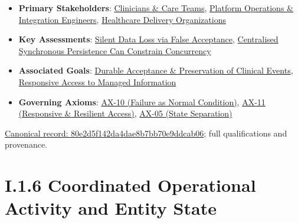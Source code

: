 \begin{itemize}


\item \textbf{Primary Stakeholders}: \href{\detokenize{../../../../../../../../docs/markdown/01-motivation/stakeholders/enterprise-stakeholders.md}}{Clinicians \& Care Teams}, \href{\detokenize{../../../../../../../../docs/markdown/01-motivation/stakeholders/enterprise-stakeholders.md}}{Platform Operations \& Integration Engineers}, \href{\detokenize{../../../../../../../../docs/markdown/01-motivation/stakeholders/enterprise-stakeholders.md}}{Healthcare Delivery Organizations}

\item \textbf{Key Assessments}: \href{\detokenize{../../../../../../../../docs/markdown/01-motivation/drivers-assessments/assessments.md}}{Silent Data Loss via False Acceptance}, \href{\detokenize{../../../../../../../../docs/markdown/01-motivation/drivers-assessments/assessments.md}}{Centralised Synchronous Persistence Can Constrain Concurrency}

\item \textbf{Associated Goals}: \href{\detokenize{../../../../../../../../docs/markdown/01-motivation/goals-outcomes/strategic-goals.md}}{Durable Acceptance \& Preservation of Clinical Events}, \href{\detokenize{../../../../../../../../docs/markdown/01-motivation/goals-outcomes/strategic-goals.md}}{Responsive Access to Managed Information}

\item \textbf{Governing Axioms}: \hyperref[element:0d9673833eb840eab03804aa076c1b0c]{AX-10 (Failure as Normal Condition)}, \hyperref[element:8a1e995f16954484a78ae1c5c114d546]{AX-11 (Responsive \& Resilient Access)}, \hyperref[element:0412a2084f0145babc4f022c71fea65f]{AX-05 (State Separation)}

\end{itemize}

{\footnotesize \href{../../../../../../../continuum/motivation/driver/80e2d5f142da4dae8b7bb70e9ddcab06.md}{Canonical record: 80e2d5f142da4dae8b7bb70e9ddcab06}; full qualifications and provenance.}\par
\section*{I.1.6 Coordinated Operational Activity and Entity State}
\label{navigation:I.1.6}

